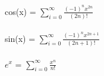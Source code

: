 \documentclass[letterpaper,12pt]{article}
\begin{document}
cos(x) = $\sum_{i=0}^{\infty} \frac{(-1)^nx^{2n}}{(2n)!}$ \\ \\

sin(x) = $\sum_{i=0}^{\infty} \frac{(-1)^nx^{2n+1}}{(2n+1)!}$ \\ \\

$e^x$ = $\sum_{i=0}^{\infty} \frac{x^{n}}{n!}$ \\ 
\end{document}
